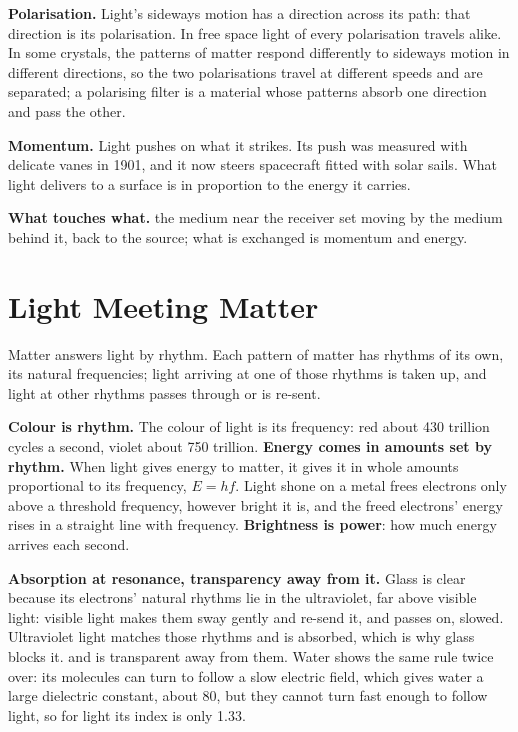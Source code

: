 \textbf{Polarisation.} Light's sideways motion has a direction across its path: that direction is its polarisation. In free space light of every polarisation travels alike. In some crystals, the patterns of matter respond differently to sideways motion in different directions, so the two polarisations travel at different speeds and are separated; a polarising filter is a material whose patterns absorb one direction and pass the other.

\textbf{Momentum.} Light pushes on what it strikes. Its push was measured with delicate vanes in 1901, and it now steers spacecraft fitted with solar sails. What light delivers to a surface is  in proportion to the energy it carries.

\textbf{What touches what.}  the medium near the receiver set moving by the medium behind it, back to the source; what is exchanged is momentum and energy.

\section{Light Meeting Matter}

Matter answers light by rhythm. Each pattern of matter has rhythms of its own, its natural frequencies; light arriving at one of those rhythms is taken up, and light at other rhythms passes through or is re-sent.

\textbf{Colour is rhythm.} The colour of light is its frequency: red about 430 trillion cycles a second, violet about 750 trillion. \textbf{Energy comes in amounts set by rhythm.} When light gives energy to matter, it gives it in whole amounts proportional to its frequency, $E = hf$. Light shone on a metal frees electrons only above a threshold frequency, however bright it is, and the freed electrons' energy rises in a straight line with frequency. \textbf{Brightness is power}: how much energy arrives each second.

\textbf{Absorption at resonance, transparency away from it.} Glass is clear because its electrons' natural rhythms lie in the ultraviolet, far above visible light: visible light makes them sway gently and re-send it, and passes on, slowed. Ultraviolet light matches those rhythms and is absorbed, which is why glass blocks it.  and is transparent away from them. Water shows the same rule twice over: its molecules can turn to follow a slow electric field, which gives water a large dielectric constant, about 80, but they cannot turn fast enough to follow light, so for light its index is only 1.33.

